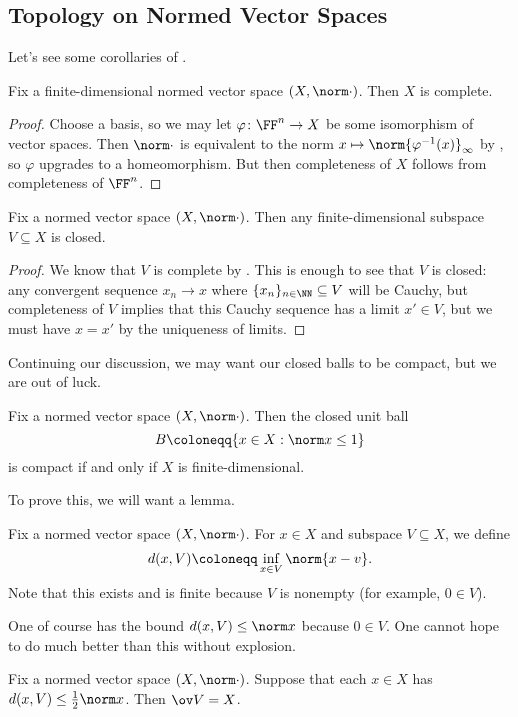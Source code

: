 \documentclass[../notes.tex]{subfiles}
\begin{document}
\subsection{Topology on Normed Vector Spaces}
Let's see some corollaries of .
\begin{corollary} \label{cor:fin-dim-complete}
	Fix a finite-dimensional normed vector space $(X,\norm\cdot)$. Then $X$ is complete.
\end{corollary}
\begin{proof}
	Choose a basis, so we may let $\varphi\colon\FF^n\to X$ be some isomorphism of vector spaces. Then $\norm\cdot$ is equivalent to the norm $x\mapsto\norm{\varphi^{-1}(x)}_\infty$ by , so $\varphi$ upgrades to a homeomorphism. But then completeness of $X$ follows from completeness of $\FF^n$.
\end{proof}
\begin{corollary} \label{cor:fin-dim-is-closed}
	Fix a normed vector space $(X,\norm\cdot)$. Then any finite-dimensional subspace $V\subseteq X$ is closed.
\end{corollary}
\begin{proof}
	We know that $V$ is complete by . This is enough to see that $V$ is closed: any convergent sequence $x_n\to x$ where $\{x_n\}_{n\in\NN}\subseteq V$ will be Cauchy, but completeness of $V$ implies that this Cauchy sequence has a limit $x'\in V$, but we must have $x=x'$ by the uniqueness of limits.
\end{proof}
Continuing our discussion, we may want our closed balls to be compact, but we are out of luck.
\begin{proposition} \label{prop:no-compact-ball}
	Fix a normed vector space $(X,\norm\cdot)$. Then the closed unit ball
	\[B\coloneqq\{x\in X:\norm x\le1\}\]
	is compact if and only if $X$ is finite-dimensional.
\end{proposition}
To prove this, we will want a lemma.
\begin{lemma}
	Fix a normed vector space $(X,\norm\cdot)$. For $x\in X$ and subspace $V\subseteq X$, we define
	\[d(x,V)\coloneqq\inf_{x\in V}\norm{x-v}.\]
	Note that this exists and is finite because $V$ is nonempty (for example, $0\in V$).
\end{lemma}
One of course has the bound $d(x,V)\le\norm x$ because $0\in V$. One cannot hope to do much better than this without explosion.
\begin{lemma} \label{lem:dense-subspace}
	Fix a normed vector space $(X,\norm\cdot)$. Suppose that each $x\in X$ has $d(x,V)\le\frac12\norm x$. Then $\ov V=X$.
\end{lemma}
\end{document}
